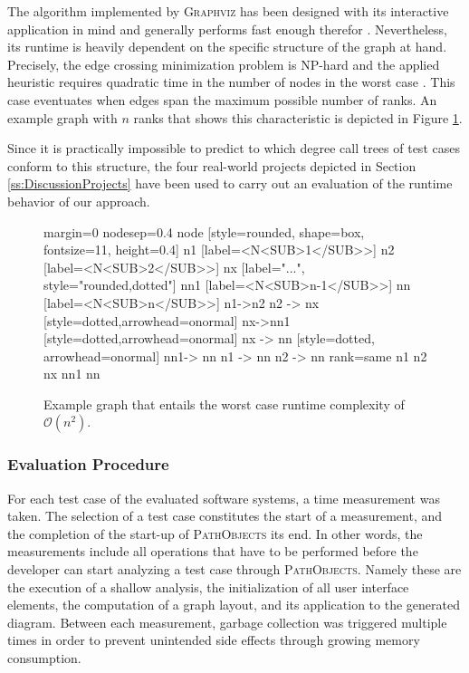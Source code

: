 The algorithm implemented by \textsc{Graphviz} has been designed with its interactive application in mind and generally performs fast enough therefor \cite{gansner_technique_1993}.
Nevertheless, its runtime is heavily dependent on the specific structure of the graph at hand.
Precisely, the edge crossing minimization problem is NP-hard and the applied heuristic requires quadratic time in the number of nodes in the worst case \cite{tamassia_handbook_2013}.
This case eventuates when edges span the maximum possible number of ranks.
An example graph with $n$ ranks that shows this characteristic is depicted in Figure \ref{fig:graph-worst-case}.

Since it is practically impossible to predict to which degree call trees of test cases conform to this structure, the four real-world projects depicted in Section \ref{ss:DiscussionProjects} have been used to carry out an evaluation of the runtime behavior of our approach.

\begin{figure}[b]
	\centering	
	{
		margin=0
		nodesep=0.4
		node [style=rounded, shape=box, fontsize=11, height=0.4]
		n1 [label=<N<SUB>1</SUB>>]
		n2 [label=<N<SUB>2</SUB>>]
		nx [label="...", style="rounded,dotted"]
		nn1 [label=<N<SUB>n-1</SUB>>]
		nn [label=<N<SUB>n</SUB>>]
		n1->n2
		n2 -> nx [style=dotted,arrowhead=onormal]
		nx->nn1 [style=dotted,arrowhead=onormal]
		nx -> nn [style=dotted, arrowhead=onormal]
		nn1-> nn
		n1 -> nn
		n2 -> nn
		{rank=same n1 n2 nx nn1 nn}
	}
	\caption[Example Graph that Entails Worst Case Runtime Complexity]{Example graph that entails the worst case runtime complexity of $\mathcal O(n^2)$.}
	\label{fig:graph-worst-case}
\end{figure}

\subsubsection{Evaluation Procedure}
For each test case of the evaluated software systems, a time measurement was taken.
The selection of a test case constitutes the start of a measurement, and the completion of the start-up of \textsc{PathObjects} its end.
In other words, the measurements include all operations that have to be performed before the developer can start analyzing a test case through \textsc{PathObjects}.
Namely these are the execution of a shallow analysis, the initialization of all user interface elements, the computation of a graph layout, and its application to the generated diagram.
Between each measurement, garbage collection was triggered multiple times in order to prevent unintended side effects through growing memory consumption.

